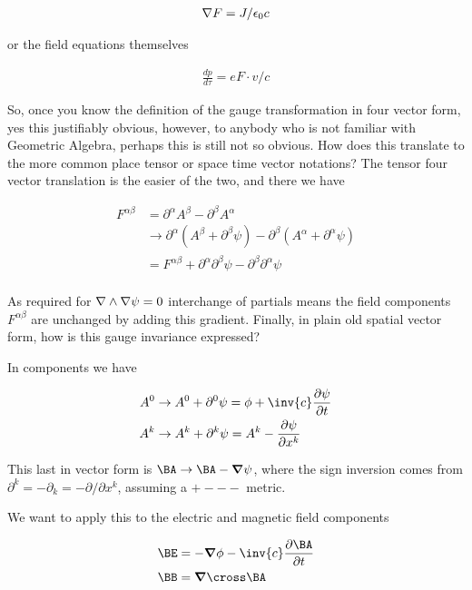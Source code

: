 \begin{align}\label{eqn:jacksonGaugeInv:foo4}
\nabla F = J/\epsilon_0 c
\end{align}

or the field equations themselves

\begin{align}\label{eqn:jacksonGaugeInv:foo5}
\frac{dp}{d\tau} = e F \cdot v/c
\end{align}

So, once you know the definition of the gauge transformation in four vector form, yes this justifiably obvious, however, to anybody who is not familiar with Geometric Algebra, perhaps this is still not so obvious.  How does this translate to the more common place tensor or space time vector notations?  The tensor four vector translation is the easier of the two, and there we have

\begin{align*}
F^{\alpha\beta} 
&= \partial^\alpha A^\beta -\partial^\beta A^\alpha \\
&\rightarrow \partial^\alpha (A^\beta + \partial^\beta \psi) -\partial^\beta (A^\alpha + \partial^\alpha \psi) \\
&= F^{\alpha\beta} + \partial^\alpha \partial^\beta \psi -\partial^\beta \partial^\alpha \psi \\
\end{align*}

As required for $\nabla \wedge \nabla \psi = 0$ interchange of partials means the field components $F^{\alpha\beta}$ are unchanged by adding this gradient.  Finally, in plain old spatial vector form, how is this gauge invariance expressed?

In components we have

\begin{align}\label{eqn:jacksonGaugeInv:foo6}
A^0 &\rightarrow A^0 + \partial^0 \psi = \phi + \inv{c}\frac{\partial \psi}{\partial t} \\
A^k &\rightarrow A^k + \partial^k \psi = A^k - \frac{\partial \psi}{\partial x^k}
\end{align}

This last in vector form is $\BA \rightarrow \BA - \spacegrad \psi$, where the sign inversion comes from $\partial^k = -\partial_k = -\partial/\partial x^k$, assuming a $+---$ metric.

We want to apply this to the electric and magnetic field components 

\begin{align}\label{eqn:jacksonGaugeInv:foo7}
\BE &= -\spacegrad \phi - \inv{c}\frac{\partial \BA}{\partial t} \\
\BB &= \spacegrad \cross \BA
\end{align}

